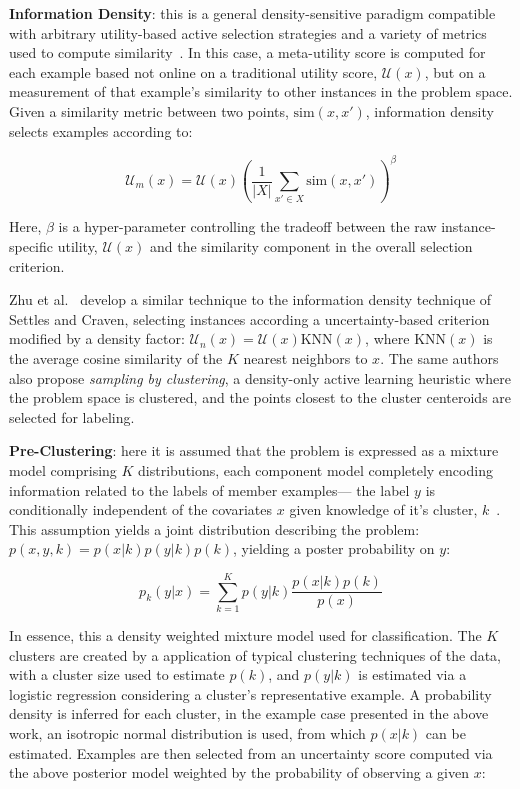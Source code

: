 \textbf{Information Density}: this is a general density-sensitive paradigm compatible with arbitrary utility-based active selection strategies and a variety of metrics used to compute similarity~\cite{settles:2008sequence}. In this case, a meta-utility score is computed for each example based not online on a traditional utility score, $\mathcal{U}(x)$, but on a measurement of that example's similarity to other instances in the problem space. Given a similarity metric between two points, $\mbox{sim}(x,x')$, information density selects examples according to:

$$\mathcal{U}_m(x) = \mathcal{U}(x)\left(\frac{1}{|X|} \sum_{x' \in X} \mbox{sim}(x,x')\right)^\beta$$

Here, $\beta$ is a hyper-parameter controlling the tradeoff between the raw instance-specific utility, $\mathcal{U}(x)$ and the similarity component in the overall selection criterion.

Zhu et al.~\cite{zhuDensity2008} develop a similar technique to the information density technique of Settles and Craven, selecting instances according a uncertainty-based criterion modified by a density factor: $\mathcal{U}_n(x) = \mathcal{U}(x)\mbox{KNN}(x)$, where $\mbox{KNN}(x)$ is the average cosine similarity of the $K$ nearest neighbors to $x$. The same authors also propose \emph{sampling by clustering}, a density-only active learning heuristic where the problem space is clustered, and the points closest to the cluster centeroids are selected for labeling.

\textbf{Pre-Clustering}: here it is assumed that the problem is expressed as a mixture model comprising $K$ distributions, each component model completely encoding information related to the labels of member examples--- the label $y$ is conditionally independent of the covariates $x$ given knowledge of it's cluster, $k$~\cite{nguyen2004preclustering}. This assumption yields a joint distribution describing the problem: $p(x,y,k) = p(x|k)p(y|k)p(k)$, yielding a poster probability on $y$:

$$p_k(y|x)=\sum_{k=1}^K p(y|k)\frac{p(x|k)p(k)}{p(x)}$$

In essence, this a density weighted mixture model used for classification. The $K$ clusters are created by a application of typical clustering techniques of the data, with a cluster size used to estimate $p(k)$, and $p(y|k)$ is estimated via a logistic regression considering a cluster's representative example. A probability density is inferred for each cluster, in the example case presented in the above work, an  isotropic normal distribution is used, from which $p(x|k)$ can be estimated. Examples are then selected from an uncertainty score computed via the above posterior model weighted by the probability of observing a given $x$:

